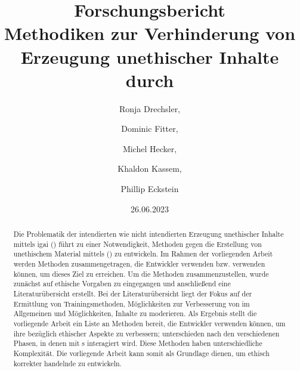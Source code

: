 \documentclass[hidelinks,12pt]{report}
\title{Forschungsbericht \\[1ex] \large Methodiken zur Verhinderung von  Erzeugung unethischer Inhalte durch \GLSabrev{igai}}
\date{26.06.2023}
\author{Ronja Drechsler, \and Dominic Fitter, \and Michel Hecker, \and Khaldon Kassem, \and Phillip Eckstein}
\begin{document}
\maketitle

\begin{abstract}
	Die Problematik der intendierten wie nicht intendierten Erzeugung unethischer Inhalte mittels \Gls{igai} () führt zu einer Notwendigkeit, Methoden gegen die Erstellung von unethischem Material mittels () zu entwickeln.
	Im Rahmen der vorliegenden Arbeit werden Methoden zusammengetragen, die Entwickler verwenden bzw. verwenden können, um dieses Ziel zu erreichen. 
	Um die Methoden zusammenzustellen, wurde zunächst auf ethische Vorgaben zu  eingegangen und anschließend eine Literaturübersicht erstellt.
	Bei der Literaturübersicht liegt der Fokus auf der Ermittlung von Trainingsmethoden, Möglichkeiten zur Verbesserung von  im Allgemeinen und Möglichkeiten, Inhalte zu moderieren.
	Als Ergebnis stellt die vorliegende Arbeit ein Liste an Methoden bereit, die Entwickler verwenden können, um ihre  bezüglich ethischer Aspekte zu verbessern; unterschieden nach den verschiedenen Phasen, in denen mit s interagiert wird. Diese Methoden haben unterschiedliche Komplexität. 
	Die vorliegende Arbeit kann somit als Grundlage dienen, um ethisch korrekter handelnde  zu entwickeln.
\end{abstract}



\tableofcontents
\newpage
\printnoidxglossary
\newpage
\end{document}
